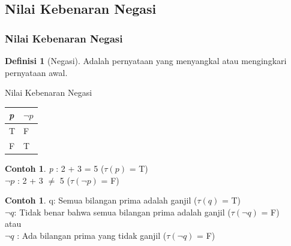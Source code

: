 \documentclass[handout]{beamer}
\theoremstyle{definition}
\newtheorem{definisi}[theorem]{Definisi}
\theoremstyle{example}
\newtheorem{contoh}[theorem]{Contoh}
\begin{document}
\subsection{Nilai Kebenaran Negasi}
\begin{frame}[shrink]
	\frametitle{Nilai Kebenaran Negasi}
	\begin{definisi}[Negasi]
		Adalah pernyataan yang menyangkal atau mengingkari pernyataan awal.		   	
	\end{definisi}
	\begin{block}{Nilai Kebenaran Negasi}
		\begin{tabular}{ | l | l | }
			\hline
			\textit{p} & $\neg\textit{p}$  \\ \hline
			T & F  \\ \hline			
			F & T  \\     		 
			\hline
		\end{tabular}
	\end{block}
	\begin{contoh}
		 \textit{p}  : 2 + 3 = 5 ($\tau(\textit{p})$ = T)\\
		 $\neg\textit{p}$ : 2 + 3 $\neq$ 5 ($\tau(\neg\textit{p})$ = F)		 
	\end{contoh}
	\begin{contoh}
	 q: Semua bilangan prima adalah ganjil ($\tau(\textit{q})$ = T) \\
	$\neg\textit{q}$: Tidak benar bahwa semua bilangan prima adalah ganjil ($\tau(\neg\textit{q})$ = F)\\
	atau\\
	$\neg\textit{q}$ 	: Ada bilangan prima yang tidak ganjil ($\tau(\neg\textit{q})$ = F)	 
	\end{contoh}
\end{frame}
\end{document}
